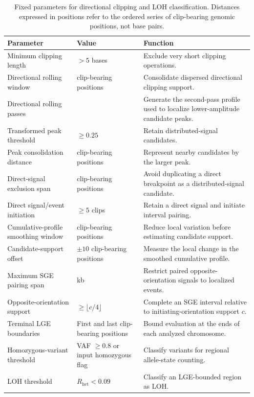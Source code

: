 \documentclass[pdflatex,sn-nature]{sn-jnl}
\begin{document}
\begin{table}[htbp]
  \centering
  \small
  \caption{Fixed parameters for directional clipping and LOH classification. Distances expressed in positions refer to the ordered series of clip-bearing genomic positions, not base pairs.}
  \label{tab:loh-clipping-parameters}
  \begin{tabularx}{\textwidth}{@{}>{\raggedright\arraybackslash}p{}>{\raggedright\arraybackslash}p{}X@{}}
    \toprule
    Parameter & Value & Function \\
    \midrule
    Minimum clipping length & \(>5\) bases & Exclude very short clipping operations. \\
    Directional rolling window & 100 clip-bearing positions & Consolidate dispersed directional clipping support. \\
    Directional rolling passes & 2 & Generate the second-pass profile used to localize lower-amplitude candidate peaks. \\
    Transformed peak threshold & \(\geq0.25\) & Retain distributed-signal candidates. \\
    Peak consolidation distance & 100 clip-bearing positions & Represent nearby candidates by the larger peak. \\
    Direct-signal exclusion span & 200 clip-bearing positions & Avoid duplicating a direct breakpoint as a distributed-signal candidate. \\
    Direct signal/event initiation & \(\geq5\) clips & Retain a direct signal and initiate interval pairing. \\
    Cumulative-profile smoothing window & 100 clip-bearing positions & Reduce local variation before estimating candidate support. \\
    Candidate-support offset & \(\pm10\) clip-bearing positions & Measure the local change in the smoothed cumulative profile. \\
    Maximum SGE pairing span & 10 kb & Restrict paired opposite-orientation signals to localized events. \\
    Opposite-orientation support & \(\geq\lfloor c/4\rfloor\) & Complete an SGE interval relative to initiating-orientation support \(c\). \\
    Terminal LGE boundaries & First and last clip-bearing positions & Bound evaluation at the ends of each analyzed chromosome. \\
    Homozygous-variant threshold & VAF \(\geq0.8\) or input homozygous flag & Classify variants for regional allele-state counting. \\
    LOH threshold & \(R_{\mathrm{het}}<0.09\) & Classify an LGE-bounded region as LOH. \\
    \bottomrule
  \end{tabularx}
\end{table}
\end{document}
